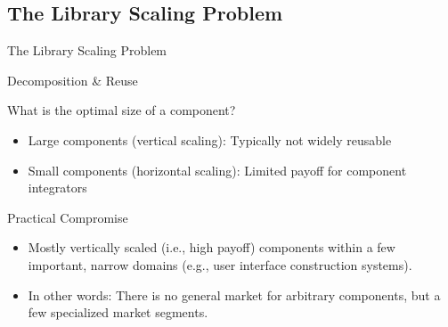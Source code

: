 \subsection{The Library Scaling Problem}
\begin{frame}{The Library Scaling Problem}
	\begin{mycolumns}[widths={40,60},animation=none]
		\begin{exampletight}{Decomposition \& Reuse}
			\centering
		\end{exampletight}
	\mynextcolumn
		\begin{definition}{What is the optimal size of a component?}
			\begin{itemize}
				\item Large components (vertical scaling): Typically not widely reusable
				\item Small components (horizontal scaling): Limited payoff for component integrators
			\end{itemize}
		\end{definition}
		\pause
		\begin{note}{Practical Compromise}
			\begin{itemize}
				\item Mostly vertically scaled (i.e., high payoff) components within a few important, narrow domains (e.g., user interface construction systems).
				\item In other words: There is no general market for arbitrary components, but a few specialized market segments.
			\end{itemize}
		\end{note}
	\end{mycolumns}
\end{frame}